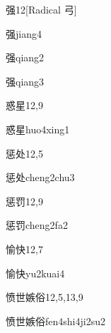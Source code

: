 \begin{entry}{强}{12}[Radical 弓]
  \begin{phonetics}{强}{jiang4}
  \end{phonetics}
  \begin{phonetics}{强}{qiang2}
  \end{phonetics}
  \begin{phonetics}{强}{qiang3}
  \end{phonetics}
\end{entry}

\begin{entry}{惑星}{12,9}
  \begin{phonetics}{惑星}{huo4xing1}
  \end{phonetics}
\end{entry}

\begin{entry}{惩处}{12,5}
  \begin{phonetics}{惩处}{cheng2chu3}
  \end{phonetics}
\end{entry}

\begin{entry}{惩罚}{12,9}
  \begin{phonetics}{惩罚}{cheng2fa2}
  \end{phonetics}
\end{entry}

\begin{entry}{愉快}{12,7}
  \begin{phonetics}{愉快}{yu2kuai4}
  \end{phonetics}
\end{entry}

\begin{entry}{愤世嫉俗}{12,5,13,9}
  \begin{phonetics}{愤世嫉俗}{fen4shi4ji2su2}
  \end{phonetics}
\end{entry}

